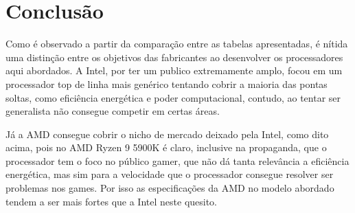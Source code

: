 \chapter{Conclusão}\label{cap:concs}

Como é observado a partir da comparação entre as tabelas apresentadas, é nítida uma distinção entre os objetivos das fabricantes ao desenvolver os processadores aqui abordados. A Intel, por ter um publico extremamente amplo, focou em um processador top de linha mais genérico tentando cobrir a maioria das pontas soltas, como eficiência energética e poder computacional, contudo, ao tentar ser generalista não consegue competir em certas áreas.


Já a AMD consegue cobrir o nicho de mercado deixado pela Intel, como dito acima, pois no AMD Ryzen 9 5900K é claro, inclusive na propaganda, que o processador tem o foco no público gamer, que não dá tanta relevância a eficiência energética, mas sim para a velocidade que o processador consegue resolver ser problemas nos games. Por isso as especificações da AMD no modelo abordado tendem a ser mais fortes que a Intel neste quesito.